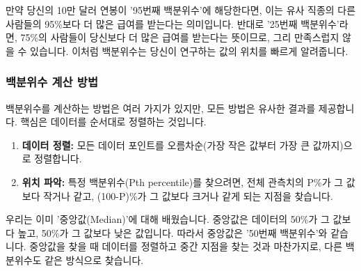\documentclass[11pt,a4paper]{book}
\theoremstyle{definition}
\begin{document}
\begin{examplebox}[title=백분위수 예시: 연봉 제안]
만약 당신의 10만 달러 연봉이 '95번째 백분위수'에 해당한다면, 이는 유사 직종의 다른 사람들의 95\%보다 더 많은 급여를 받는다는 의미입니다. 반대로 '25번째 백분위수'라면, 75\%의 사람들이 당신보다 더 많은 급여를 받는다는 뜻이므로, 그리 만족스럽지 않을 수 있습니다. 이처럼 백분위수는 당신이 연구하는 값의 위치를 빠르게 알려줍니다.
\end{examplebox}

\subsubsection*{백분위수 계산 방법}

백분위수를 계산하는 방법은 여러 가지가 있지만, 모든 방법은 유사한 결과를 제공합니다. 핵심은 데이터를 순서대로 정렬하는 것입니다.

\begin{enumerate}
    \item \textbf{데이터 정렬:} 모든 데이터 포인트를 오름차순(가장 작은 값부터 가장 큰 값까지)으로 정렬합니다.
    \item \textbf{위치 파악:} 특정 백분위수(Pth percentile)를 찾으려면, 전체 관측치의 P\%가 그 값보다 작거나 같고, (100-P)\%가 그 값보다 크거나 같게 되는 지점을 찾습니다.
\end{enumerate}

\begin{infobox}[title=중앙값 (Median)과 백분위수]
우리는 이미 '중앙값(Median)'에 대해 배웠습니다. 중앙값은 데이터의 50\%가 그 값보다 높고, 50\%가 그 값보다 낮은 값입니다. 따라서 중앙값은 '50번째 백분위수'와 같습니다. 중앙값을 찾을 때 데이터를 정렬하고 중간 지점을 찾는 것과 마찬가지로, 다른 백분위수도 같은 방식으로 찾습니다.
\end{infobox}
\end{document}
